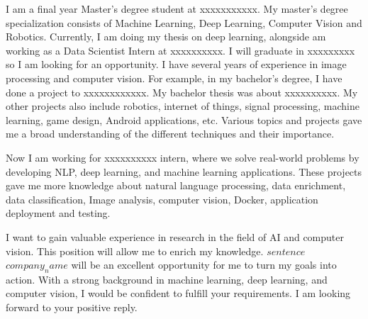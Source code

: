 \documentclass[11pt, a4paper]{awesome-cv}
\begin{document}
\makecvheader
\makelettertitle
\begin{cvletter}
I am a final year Master's degree student at xxxxxxxxxxx. My master's degree specialization consists of Machine Learning, Deep Learning, Computer Vision and Robotics. Currently, I am doing my thesis on deep learning, alongside am working as a Data Scientist Intern at xxxxxxxxxx. I will graduate in xxxxxxxxx so I am looking for an opportunity.
I have several years of experience in image processing and computer vision. For example, in my bachelor's degree, I have done a project to xxxxxxxxxxxx. My bachelor thesis was about xxxxxxxxxx. My other projects also include robotics, internet of things, signal processing, machine learning, game design, Android applications, etc. Various topics and projects gave me a broad understanding of the different techniques and their importance.

Now I am working for xxxxxxxxxx intern, where we solve real-world problems by developing NLP, deep learning, and machine learning applications. These projects gave me more knowledge about natural language processing, data enrichment, data classification, Image analysis, computer vision, Docker, application deployment and testing.

I want to gain valuable experience in research in the field of AI and computer vision. This position will allow me to enrich my knowledge. $sentence$ $company_name$ will be an excellent opportunity for me to turn my goals into action. With a strong background in machine learning, deep learning, and computer vision, I would be confident to fulfill your requirements.
I am looking forward to your positive reply.

\end{cvletter}
\makeletterclosing
\end{document}
